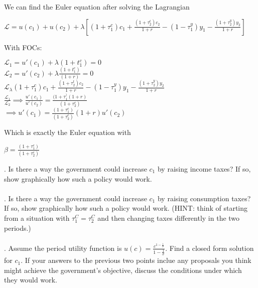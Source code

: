 \documentclass[11pt]{SelfArxOneColBMN}
\begin{document}
\begin{solution}
  We can find the Euler equation after solving the Lagrangian
  \begin{center}
    $\mathcal{L} = u(c_1) + u(c_2) + \lambda[(1 + \tau_1^c)c_1 + \frac{(1 + \tau_2^t)c_2}{1 + r} - (1 - \tau_1^y)y_1 - \frac{(1 + \tau_2^y)y_2}{1 + r}]$
  \end{center}
  With FOCs:
  \begin{center}
    $\mathcal{L}_1 = u'(c_1) + \lambda(1 + t_1^c) = 0$\\
    $\mathcal{L}_2 = u'(c_2) + \lambda\frac{(1 + t_1^c)}{(1 + r)} = 0$\\
    $\mathcal{L}_\lambda (1 + \tau_1^c)c_1 + \frac{(1 + \tau_2^t)c_2}{1 + r} - (1 - \tau_1^y)y_1 - \frac{(1 + \tau_2^y)y_2}{1 + r}$\\
    $\frac{\mathcal{L}_1}{\mathcal{L}_2} \implies \frac{u'(c_1)}{u'(c_2)} = \frac{(1 + \tau_1^)(1 + r)}{(1 + \tau_2^c)}$\\
    $\implies u'(c_1) = \frac{(1 + \tau_1^c)}{(1 + \tau_2^c)}(1 + r)u'(c_2)$
  \end{center}
  Which is exactly the Euler equation with
  \begin{center}
    $\beta = \frac{(1 + \tau_1^c)}{(1 + \tau_2^c)}$
  \end{center}
\end{solution}
. Is there a way the government could increase $c_1$ by raising income taxes? If so, show graphically how such a policy would work.\\
\\
. Is there a way the government could increase $c_1$ by raising consumption taxes? If so, show graphically how such a policy would work. (HINT: think of starting from a situation with $\tau_1^C = \tau_2^C$ and then changing taxes differently in the two periods.)\\
\\
. Assume the period utility function is $u(c) = \frac{c^{1 - \frac{1}{\sigma}}}{1 - \frac{1}{\sigma}}$. Find a closed form solution for $c_1$. If your answers to the previous two points inclue any proposals you think might achieve the government's objective, discuss the conditions under which they would work.\\
\end{document}
